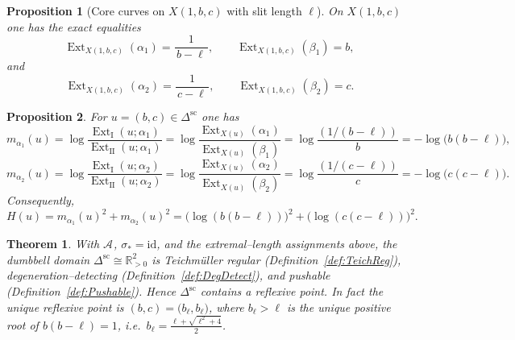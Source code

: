 \documentclass[10pt,a4paper]{amsart}
\newtheorem{theorem}{Theorem}
\newtheorem{proposition}{Proposition}
\DeclareMathOperator{\Ext}{Ext}
\newcommand{\R}{\mathbb{R}}
\newcommand{\id}{\mathrm{id}}
\begin{document}
\begin{proposition}[Core curves on \(X(1,b,c)\) with slit length \(\ell\)]\label{prop:ExtCorePlumbing}
On \(X(1,b,c)\) one has the exact equalities
\[
\Ext_{X(1,b,c)}(\alpha_1)=\frac{1}{\,b-\ell\,},\qquad
\Ext_{X(1,b,c)}(\beta_1)=b,
\]
and
\[
\Ext_{X(1,b,c)}(\alpha_2)=\frac{1}{\,c-\ell\,},\qquad
\Ext_{X(1,b,c)}(\beta_2)=c.
\]
\end{proposition}

\begin{proposition}\label{prop:mismatch_db}
For \(u=(b,c)\in\Delta^{\mathrm{sc}}_{}\) one has
\[
m_{\alpha_1}(u)=\log\frac{\Ext_{\mathrm{I}}(u;\alpha_1)}{\Ext_{\mathrm{II}}(u;\alpha_1)}
=\log\frac{\Ext_{X(u)}(\alpha_1)}{\Ext_{X(u)}(\beta_1)}
=\log\frac{(1/(b-\ell))}{b}
=-\log\bigl(b(b-\ell)\bigr),
\]
\[
m_{\alpha_2}(u)=\log\frac{\Ext_{\mathrm{I}}(u;\alpha_2)}{\Ext_{\mathrm{II}}(u;\alpha_2)}
=\log\frac{\Ext_{X(u)}(\alpha_2)}{\Ext_{X(u)}(\beta_2)}
=\log\frac{(1/(c-\ell))}{c}
=-\log\bigl(c(c-\ell)\bigr).
\]
Consequently,
\[
H(u)=m_{\alpha_1}(u)^2+m_{\alpha_2}(u)^2
=\bigl(\log(b(b-\ell))\bigr)^2+\bigl(\log(c(c-\ell))\bigr)^2.
\]
\end{proposition}

\begin{theorem}\label{thm:good_example}
With \(\mathcal A_{}\), \(\sigma_\ast=\id\), and the extremal--length assignments above, the
dumbbell domain \(\Delta^{\mathrm{sc}}_{}\cong\R_{>0}^2\) is Teichm\"uller regular
(Definition~\ref{def:TeichReg}), degeneration--detecting (Definition~\ref{def:DegDetect}), and pushable
(Definition~\ref{def:Pushable}).  Hence \(\Delta^{\mathrm{sc}}_{}\) contains a reflexive point.
In fact the unique reflexive point is \((b,c)=\bigl(b_\ell,b_\ell\bigr)\), where \(b_\ell> \ell\) is the unique positive root of \(b(b-\ell)=1\), i.e.\ \(b_\ell=\frac{\ell+\sqrt{\ell^2+4}}{2}\).
\end{theorem}
\end{document}
